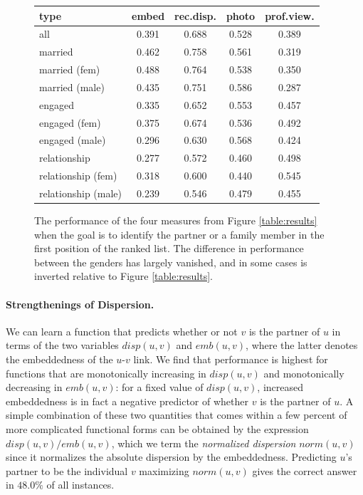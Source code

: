 \documentclass{sigchi}
\newcommand{\xhdr}[1]{\paragraph*{\bf #1.}}
\def\rs{\vspace*{-0.10in}}
\begin{document}
\begin{figure}
\begin{center}
\begin{tabular}{|l|c|c|c|c|}
\hline
type & embed & \mbox{rec.disp.} & \mbox{photo} & \mbox{prof.view.}
\\\hline
all & 0.391 & 0.688 & 0.528 & 0.389 \\ \hline 
married & 0.462 & 0.758 & 0.561 & 0.319 \\ \hline 
married (fem) & 0.488 & 0.764 & 0.538 & 0.350 \\ \hline 
married (male) & 0.435 & 0.751 & 0.586 & 0.287 \\ \hline 
engaged & 0.335 & 0.652 & 0.553 & 0.457 \\ \hline 
engaged (fem) & 0.375 & 0.674 & 0.536 & 0.492 \\ \hline 
engaged (male) & 0.296 & 0.630 & 0.568 & 0.424 \\ \hline 
relationship & 0.277 & 0.572 & 0.460 & 0.498 \\ \hline 
relationship (fem) & 0.318 & 0.600 & 0.440 & 0.545 \\ \hline 
relationship (male) & 0.239 & 0.546 & 0.479 & 0.455 \\ \hline 
\end{tabular}
\caption{
\label{table:family}
The performance of the four measures from Figure \ref{table:results}
when the goal is to identify the partner or a family member in the
first position of the ranked list.
The difference in performance between the genders has largely
vanished, and in some cases is inverted relative to Figure \ref{table:results}.
\rs 
}
\end{center}
\end{figure}

\xhdr{Strengthenings of Dispersion}
We can learn a function 
that predicts whether or not
$v$ is the partner of $u$ in terms of the two variables
$disp(u,v)$ and $emb(u,v)$, where the latter denotes the embeddedness
of the $u$-$v$ link.  
We find that performance is highest for functions that are monotonically
increasing in $disp(u,v)$ and monotonically decreasing in $emb(u,v)$:
for a fixed value of $disp(u,v)$, increased embeddedness is in fact
a negative predictor of whether $v$ is the partner of $u$.
A simple combination of these two quantities that comes within
a few percent of more complicated functional forms can be obtained
by the expression
$disp(u,v) / emb(u,v)$, which we term the {\em normalized dispersion}
$norm(u,v)$ since it normalizes the absolute dispersion by the embeddedness.
Predicting $u$'s partner to be the individual
$v$ maximizing $norm(u,v)$ gives 
the correct answer in $48.0\%$ of all instances.
\end{document}
